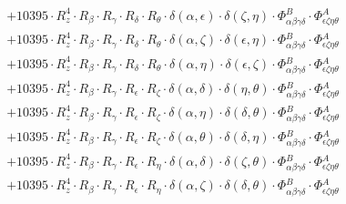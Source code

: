 \documentclass{article}
\begin{document}
\begin{equation}
\begin{array}{c}
 \\[0.2em] 		 + 10395 \cdot R_{z}^{4} \cdot R_{\beta{}} \cdot R_{\gamma{}} \cdot R_{\delta{}} \cdot R_{\theta{}} \cdot \delta{}\left(\alpha{}, \epsilon{}\right) \cdot \delta{}\left(\zeta{}, \eta{}\right) \cdot \Phi{}^{B}_{\alpha{}\beta{}\gamma{}\delta{}} \cdot \Phi{}^{A}_{\epsilon{}\zeta{}\eta{}\theta{}} 
 \\[0.2em] 		 + 10395 \cdot R_{z}^{4} \cdot R_{\beta{}} \cdot R_{\gamma{}} \cdot R_{\delta{}} \cdot R_{\theta{}} \cdot \delta{}\left(\alpha{}, \zeta{}\right) \cdot \delta{}\left(\epsilon{}, \eta{}\right) \cdot \Phi{}^{B}_{\alpha{}\beta{}\gamma{}\delta{}} \cdot \Phi{}^{A}_{\epsilon{}\zeta{}\eta{}\theta{}} 
 \\[0.2em] 		 + 10395 \cdot R_{z}^{4} \cdot R_{\beta{}} \cdot R_{\gamma{}} \cdot R_{\delta{}} \cdot R_{\theta{}} \cdot \delta{}\left(\alpha{}, \eta{}\right) \cdot \delta{}\left(\epsilon{}, \zeta{}\right) \cdot \Phi{}^{B}_{\alpha{}\beta{}\gamma{}\delta{}} \cdot \Phi{}^{A}_{\epsilon{}\zeta{}\eta{}\theta{}} 
 \\[0.2em] 		 + 10395 \cdot R_{z}^{4} \cdot R_{\beta{}} \cdot R_{\gamma{}} \cdot R_{\epsilon{}} \cdot R_{\zeta{}} \cdot \delta{}\left(\alpha{}, \delta{}\right) \cdot \delta{}\left(\eta{}, \theta{}\right) \cdot \Phi{}^{B}_{\alpha{}\beta{}\gamma{}\delta{}} \cdot \Phi{}^{A}_{\epsilon{}\zeta{}\eta{}\theta{}} 
 \\[0.2em] 		 + 10395 \cdot R_{z}^{4} \cdot R_{\beta{}} \cdot R_{\gamma{}} \cdot R_{\epsilon{}} \cdot R_{\zeta{}} \cdot \delta{}\left(\alpha{}, \eta{}\right) \cdot \delta{}\left(\delta{}, \theta{}\right) \cdot \Phi{}^{B}_{\alpha{}\beta{}\gamma{}\delta{}} \cdot \Phi{}^{A}_{\epsilon{}\zeta{}\eta{}\theta{}} 
 \\[0.2em] 		 + 10395 \cdot R_{z}^{4} \cdot R_{\beta{}} \cdot R_{\gamma{}} \cdot R_{\epsilon{}} \cdot R_{\zeta{}} \cdot \delta{}\left(\alpha{}, \theta{}\right) \cdot \delta{}\left(\delta{}, \eta{}\right) \cdot \Phi{}^{B}_{\alpha{}\beta{}\gamma{}\delta{}} \cdot \Phi{}^{A}_{\epsilon{}\zeta{}\eta{}\theta{}} 
 \\[0.2em] 		 + 10395 \cdot R_{z}^{4} \cdot R_{\beta{}} \cdot R_{\gamma{}} \cdot R_{\epsilon{}} \cdot R_{\eta{}} \cdot \delta{}\left(\alpha{}, \delta{}\right) \cdot \delta{}\left(\zeta{}, \theta{}\right) \cdot \Phi{}^{B}_{\alpha{}\beta{}\gamma{}\delta{}} \cdot \Phi{}^{A}_{\epsilon{}\zeta{}\eta{}\theta{}} 
 \\[0.2em] 		 + 10395 \cdot R_{z}^{4} \cdot R_{\beta{}} \cdot R_{\gamma{}} \cdot R_{\epsilon{}} \cdot R_{\eta{}} \cdot \delta{}\left(\alpha{}, \zeta{}\right) \cdot \delta{}\left(\delta{}, \theta{}\right) \cdot \Phi{}^{B}_{\alpha{}\beta{}\gamma{}\delta{}} \cdot \Phi{}^{A}_{\epsilon{}\zeta{}\eta{}\theta{}} 

\end{array}
\end{equation}
\end{document}
